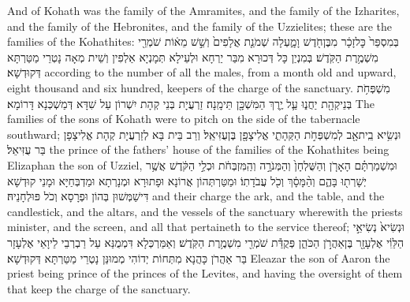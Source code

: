 {And of Kohath was the family of the Amramites, and the family of the Izharites, and the family of the Hebronites, and the family of the Uzzielites; these are the families of the Kohathites:}{}
{בְּמִסְפַּר֙ כׇּל\maqqaf זָכָ֔ר מִבֶּן\maqqaf חֹ֖דֶשׁ וָמָ֑עְלָה שְׁמֹנַ֤ת אֲלָפִים֙ וְשֵׁ֣שׁ מֵא֔וֹת שֹׁמְרֵ֖י מִשְׁמֶ֥רֶת הַקֹּֽדֶשׁ׃}
{בְּמִנְיַן כָּל דְּכוּרָא מִבַּר יַרְחָא וּלְעֵילָא תְּמָנְיָא אַלְפִין וְשֵׁית מְאָה נָטְרֵי מַטַּרְתָּא דְּקוּדְשָׁא׃}
{according to the number of all the males, from a month old and upward, eight thousand and six hundred, keepers of the charge of the sanctuary.}{}
{מִשְׁפְּחֹ֥ת בְּנֵי\maqqaf קְהָ֖ת יַחֲנ֑וּ עַ֛ל יֶ֥רֶךְ הַמִּשְׁכָּ֖ן תֵּימָֽנָה׃}
{זַרְעֲיָת בְּנֵי קְהָת יִשְׁרוֹן עַל שִׁדָּא דְּמַשְׁכְּנָא דָּרוֹמָא׃}
{The families of the sons of Kohath were to pitch on the side of the tabernacle southward;}{}
{וּנְשִׂ֥יא בֵֽית\maqqaf אָ֖ב לְמִשְׁפְּחֹ֣ת הַקְּהָתִ֑י אֱלִיצָפָ֖ן בֶּן\maqqaf עֻזִּיאֵֽל׃}
{וְרַב בֵּית בָּא לְזַרְעֲיָת קְהָת אֱלִיצָפָן בַּר עֻזִּיאֵל׃}
{the prince of the fathers’ house of the families of the Kohathites being Elizaphan the son of Uzziel,}{}
{וּמִשְׁמַרְתָּ֗ם הָאָרֹ֤ן וְהַשֻּׁלְחָן֙ וְהַמְּנֹרָ֣ה וְהַֽמִּזְבְּחֹ֔ת וּכְלֵ֣י הַקֹּ֔דֶשׁ אֲשֶׁ֥ר יְשָׁרְת֖וּ בָּהֶ֑ם וְהַ֨מָּסָ֔ךְ וְכֹ֖ל עֲבֹדָתֽוֹ׃}
{וּמַטַּרְתְּהוֹן אֲרוֹנָא וּפָתוּרָא וּמְנָרְתָא וּמַדְבְּחַיָּא וּמָנֵי קוּדְשָׁא דִּישַׁמְּשׁוּן בְּהוֹן וּפְרָסָא וְכֹל פּוּלְחָנֵיהּ׃}
{and their charge the ark, and the table, and the candlestick, and the altars, and the vessels of the sanctuary wherewith the priests minister, and the screen, and all that pertaineth to the service thereof;}{}
{וּנְשִׂיא֙ נְשִׂיאֵ֣י הַלֵּוִ֔י אֶלְעָזָ֖ר בֶּן\maqqaf אַהֲרֹ֣ן הַכֹּהֵ֑ן פְּקֻדַּ֕ת שֹׁמְרֵ֖י מִשְׁמֶ֥רֶת הַקֹּֽדֶשׁ׃}
{וְאַמַּרְכְּלָא דִּמְמֻנַּא עַל רַבְרְבֵי לֵיוָאֵי אֶלְעָזָר בַּר אַהֲרֹן כָּהֲנָא מִתְּחוֹת יְדוֹהִי מְמוּנַּן נָטְרֵי מַטַּרְתָּא דְּקוּדְשָׁא׃}
{Eleazar the son of Aaron the priest being prince of the princes of the Levites, and having the oversight of them that keep the charge of the sanctuary.}{}
